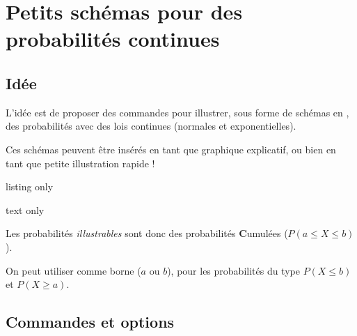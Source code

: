 \newpage

\section{Petits schémas pour des probabilités continues}\label{schemasprobas}

\subsection{Idée}

\begin{tipblock}
L'idée est de proposer des commandes pour illustrer, sous forme de schémas en \TikZ, des probabilités avec des lois continues (normales et exponentielles).

\smallskip

Ces \og schémas \fg{} peuvent être insérés en tant que graphique explicatif, ou bien en tant que petite illustration rapide !
\end{tipblock}

\begin{PresCodeTexPL}{listing only}

\end{PresCodeTexPL}

\begin{PresCodeSortiePL}{text only}
\hfill{}\hspace{3cm}\hfill~
\end{PresCodeSortiePL}

\begin{cautionblock}
Les probabilités \textit{illustrables} sont donc des probabilités \textbf{C}umulées ($P(a\leqslant X\leqslant b)$).

\smallskip

On peut utiliser \ctex{*} comme borne ($a$ ou $b$), pour les probabilités du type $P(X\leqslant b)$ et $P(X \geqslant a)$.
\end{cautionblock}

\subsection{Commandes et options}

